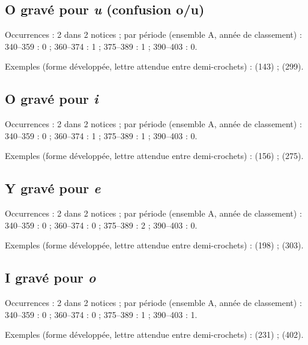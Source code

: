 \subsection*{O gravé pour \textit{u} (confusion o/u)}
\noindent Occurrences : 2 dans 2 notices ; par période (ensemble A, année de classement) : 340–359 : 0 ; 360–374 : 1 ; 375–389 : 1 ; 390–403 : 0.\par
\noindent Exemples (forme développée, lettre attendue entre demi-crochets) :  (143) ;  (299).\par
{}\par\medskip
\subsection*{O gravé pour \textit{i}}
\noindent Occurrences : 2 dans 2 notices ; par période (ensemble A, année de classement) : 340–359 : 0 ; 360–374 : 1 ; 375–389 : 1 ; 390–403 : 0.\par
\noindent Exemples (forme développée, lettre attendue entre demi-crochets) :  (156) ;  (275).\par
{}\par\medskip
\subsection*{Y gravé pour \textit{e}}
\noindent Occurrences : 2 dans 2 notices ; par période (ensemble A, année de classement) : 340–359 : 0 ; 360–374 : 0 ; 375–389 : 2 ; 390–403 : 0.\par
\noindent Exemples (forme développée, lettre attendue entre demi-crochets) :  (198) ;  (303).\par
{}\par\medskip
\subsection*{I gravé pour \textit{o}}
\noindent Occurrences : 2 dans 2 notices ; par période (ensemble A, année de classement) : 340–359 : 0 ; 360–374 : 0 ; 375–389 : 1 ; 390–403 : 1.\par
\noindent Exemples (forme développée, lettre attendue entre demi-crochets) :  (231) ;  (402).\par
{}\par\medskip
